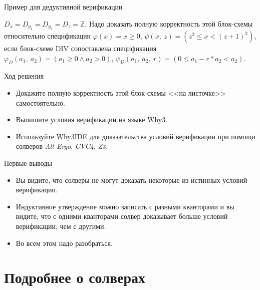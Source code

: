\documentclass[hyperref={unicode=true}]{beamer}
\begin{document}
\begin{frame}[fragile]{Пример для дедуктивной верификации}
\begin{multicols}{2}
	\normalsize

    $D_{x} = D_{y_1} = D_{y_2} = D_{z} = \mathbb{Z}$.
    Надо доказать полную корректность этой блок-схемы
    относительно спецификации $\varphi(x) = x \geq 0$,
    $\psi(x,~z) = (z^2 \leq x < (z + 1)^2)$, если
    блок-схеме DIV сопоставлена спецификация
    $\varphi_D(a_1,~a_2) = (a_1 \geq 0 \land a_2 > 0)$,
    $\psi_D(a_1,~a_2,~r) = (0 \leq a_1 - r * a_2 < a_2)$.
    \end{multicols}
	\end{frame}

    \begin{frame}{Ход решения}
    \begin{itemize}
    \item
    Докажите полную корректность этой блок-схемы
    <<на листочке>> самостоятельно.
    \item
    Выпишите условия верификации на языке Why3.
    \item
    Используйте Why3IDE для доказательства условий
    верификации при помощи солверов \textsl{Alt-Ergo},
    \textsl{CVC4}, \textsl{Z3}.
    \end{itemize}
    \end{frame}

    \begin{frame}{Первые выводы}
    \begin{itemize}
    \item
    Вы видите, что солверы не могут доказать некоторые
    из истинных условий верификации.
    \item
    Индуктивное утверждение можно записать с разными
    кванторами и вы видите, что с одними кванторами солвер
    доказывает больше условий верификации, чем с другими.
    \item
    Во всем этом надо разобраться.
    \end{itemize}
    \end{frame}

    \section{Подробнее о солверах}
\end{document}
